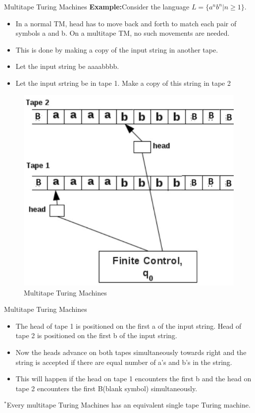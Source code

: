 \documentclass{beamer}
\begin{document}
\begin{frame}{ Multitape Turing Machines}
\textbf{Example:}Consider the language $L = \{a^nb^n \big |n \geq 1\}.$

\begin{itemize}
	\item In a normal TM, head has to move back and forth to match each pair of symbols a and b. On a multitape TM, no such	movements are needed.
	\item This is done by making a copy of the input string in another tape.
	\item Let the input string be aaaabbbb.
	\item Let the input srtring be in tape 1. Make a copy of this string in tape 2
\end{itemize}
\begin{figure}
	\includegraphics[scale=.4]{img5/m15}
	\caption{Multitape Turing Machines}
\end{figure}
\end{frame}
\begin{frame}{ Multitape Turing Machines}
\begin{itemize}
	\item The head of tape 1 is positioned on the first a of the input string. Head of tape 2 is positioned on the first b of the input
	string.
	\item Now the heads advance on both tapes simultaneously towards right and the string is accepted if there are equal number
	of a’s and b’s in the string.
	\item This will happen if the head on tape 1 encounters the first b and the head on tape 2 encounters the first B(blank symbol) simultaneously.
\end{itemize}
\textbf{$^*$}Every multitape Turing Machines has an equivalent single tape Turing
machine.

\end{frame}
\end{document}
